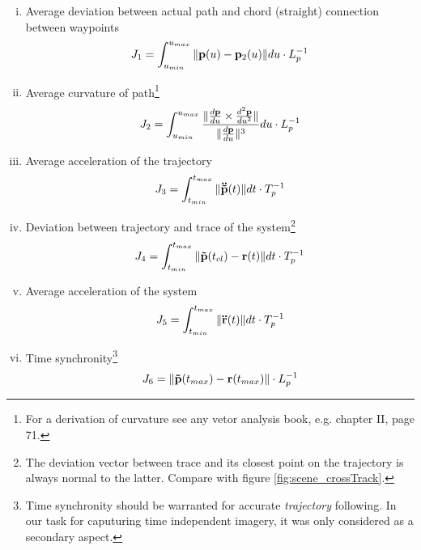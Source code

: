 \begin{enumerate}[i)] 
\item Average deviation between actual path and chord (straight) connection between waypoints
\label{item:static_deviation}
\begin{equation}
J_1 = \int_{u_{min}}^{u_{max}} \|{\bf p}(u)- {\bf p}_2(u)\| du \cdot L_p^{-1} \label{eq:static_deviation}
\end{equation}

\item Average curvature of path\footnote{For a derivation of curvature see any vetor analysis book, e.g. \cite{stammbach} chapter II, page 71.}
\label{item:static_curvature}
\begin{equation}
J_2 = \int_{u_{min}}^{u_{max}} \frac{\| \frac{d {\bf p}}{du} \times \frac{d^{2} {\bf p}}{du^{2}} \|}{\|  \frac{d {\bf p}}{du} \|^3}du \cdot L_p^{-1}
\label{eq:static_curvature}
\end{equation}

\item Average acceleration of the trajectory
\label{item:static_acceleration}
\begin{equation}
J_3 = \int_{t_{min}}^{t_{max}} \|{\bf \ddot{\tilde{p}}}(t)\| dt \cdot T_p^{-1} \label{eq:static_acceleration}
\end{equation}

\item Deviation between trajectory and trace of the system\footnote{The deviation vector between trace and its closest point on the trajectory is always normal to the latter. Compare with figure \ref{fig:scene_crossTrack}.}
\label{item:dynamic_deviation}
\begin{equation}
J_4 = \int_{t_{min}}^{t_{max}} \| {\bf \tilde{p}}(t_{cl}) - {\bf r}(t) \| dt \cdot T_p^{-1} 
\label{eq:dynamic_deviation}
\end{equation}

\item Average acceleration of the system
\label{item:dynamic_acceleration}
\begin{equation}
J_5 = \int_{t_{min}}^{t_{max}} \|{\bf \ddot{r}}(t)\| dt \cdot T_p^{-1}
\end{equation}

\item Time synchronity\footnote{Time synchronity should be warranted for accurate \textit{trajectory} following. In our task for caputuring time independent imagery, it was only considered as a secondary aspect.}
\label{item:dynamic_synchronity}
\begin{equation}
J_6 = \| {\bf \tilde{p}}(t_{max}) - {\bf r}(t_{max}) \| \cdot L_p^{-1} \label{eq:dynamic_synchronity}
\end{equation}

\end{enumerate}


